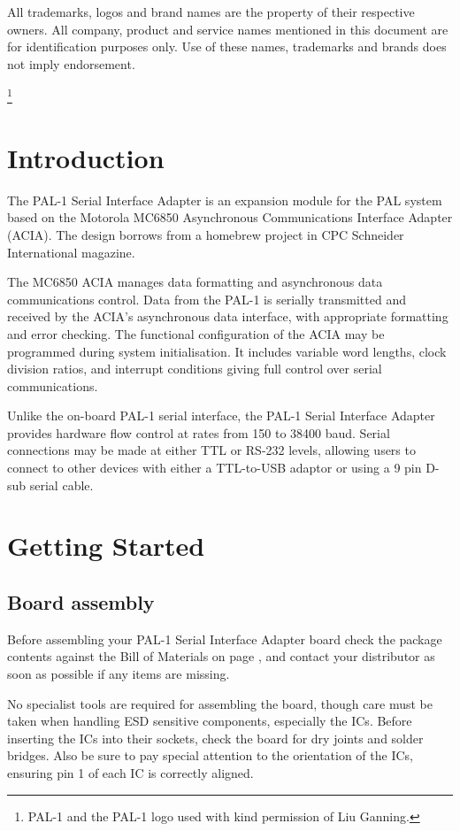 \documentclass[a4paper,11pt,twoside,openright]{report}
\newcommand\mainmatter{
  \cleardoublepage
  \pagenumbering{arabic}}
\begin{document}
All trademarks, logos and brand names are the property of their respective owners. All company, product and service names mentioned in this document are for identification purposes only. Use of these names, trademarks and brands does not imply endorsement.

\thanks{PAL-1 and the PAL-1 logo used with kind permission of Liu Ganning.}
\clearpage
\tableofcontents
\listoffigures
\cleardoublepage
\chapter*{Introduction}
The PAL-1 Serial Interface Adapter is an expansion module for the PAL system\cite{ganning1} based on the Motorola MC6850 Asynchronous Communications Interface Adapter (ACIA)\cite{motorola1}. The design borrows from a homebrew project in CPC Schneider International magazine\cite[pp. 88--92]{cpc1}.

The MC6850 ACIA manages data formatting and asynchronous data communications control. Data from the PAL-1 is serially transmitted and received by the ACIA's asynchronous data interface, with appropriate formatting and error checking. The functional configuration of the ACIA may be programmed during system initialisation. It includes variable word lengths, clock division ratios, and interrupt conditions giving full control over serial communications\cite[p. 11]{motorola2}.

Unlike the on-board PAL-1 serial interface, the PAL-1 Serial Interface Adapter provides hardware flow control at rates from 150 to 38400 baud. Serial connections may be made at either TTL or RS-232 levels, allowing users to connect to other devices with either a TTL-to-USB adaptor or using a 9 pin D-sub serial cable.

\mainmatter
\chapter{Getting Started}
\section*{Board assembly}
Before assembling your PAL-1 Serial Interface Adapter board check the package contents against the Bill of Materials on page \pageref{sec:bom}, and contact your distributor as soon as possible if any items are missing.

No specialist tools are required for assembling the board, though care must be taken when handling ESD sensitive components, especially the ICs. Before inserting the ICs into their sockets, check the board for dry joints and solder bridges. Also be sure to pay special attention to the orientation of the ICs, ensuring pin 1 of each IC is correctly aligned.
\end{document}
